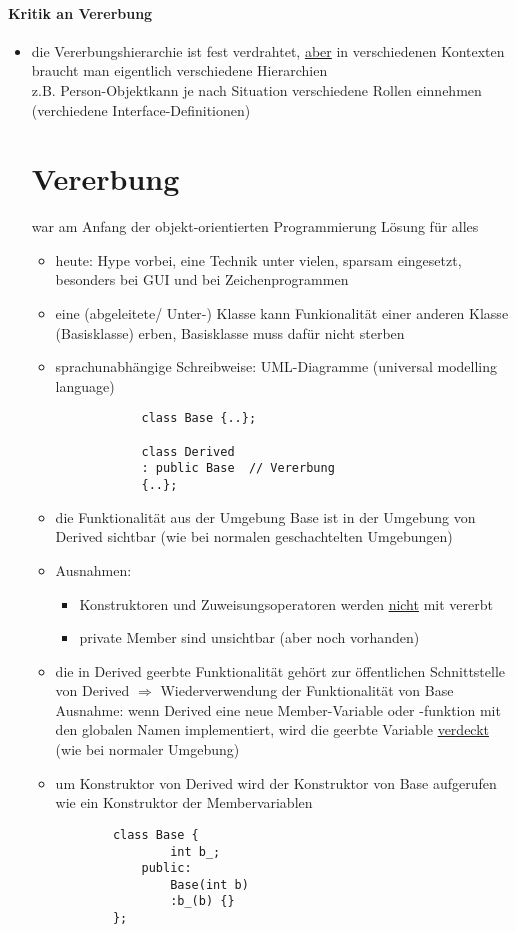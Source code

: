 \documentclass{article}
\begin{document}
		\paragraph*{Kritik an Vererbung}
		\begin{itemize}
			\item die Vererbungshierarchie ist fest verdrahtet, \underline{aber} in verschiedenen Kontexten braucht man eigentlich verschiedene Hierarchien \\
			z.B. Person-Objektkann je nach Situation verschiedene Rollen einnehmen (verchiedene Interface-Definitionen)

\section*{Vererbung}
	war am Anfang der objekt-orientierten Programmierung Lösung für alles
	\begin{itemize}
		\item heute: Hype vorbei, eine Technik unter vielen, sparsam eingesetzt, besonders bei GUI und bei Zeichenprogrammen
		\item eine (abgeleitete/ Unter-) Klasse kann Funkionalität einer anderen Klasse (Basisklasse) erben, Basisklasse muss dafür nicht sterben
		\item sprachunabhängige Schreibweise: UML-Diagramme (universal modelling language) \\
		\begin{lstlisting}
			class Base {..};

			class Derived
			: public Base  // Vererbung
			{..};
		\end{lstlisting}
		\item die Funktionalität aus der Umgebung Base ist in der Umgebung von Derived sichtbar (wie bei normalen geschachtelten Umgebungen) 
		\item Ausnahmen: 
		\begin{itemize}
			\item Konstruktoren und Zuweisungsoperatoren werden \underline{nicht} mit vererbt
			\item private Member sind unsichtbar (aber noch vorhanden)
		\end{itemize}
		\item die in Derived geerbte Funktionalität gehört zur öffentlichen Schnittstelle von Derived $\Rightarrow $ Wiederverwendung der Funktionalität von Base \\
		Ausnahme: wenn Derived eine neue Member-Variable oder -funktion mit den globalen Namen implementiert, wird die geerbte Variable \underline{verdeckt} (wie bei normaler Umgebung)
		\item um Konstruktor von Derived wird der Konstruktor von Base aufgerufen wie ein Konstruktor der Membervariablen
		\begin{lstlisting}
		class Base {
				int b_;
			public:
				Base(int b)
				:b_(b) {}
		};


\end{lstlisting}
\end{itemize}
\end{itemize}
\end{document}
